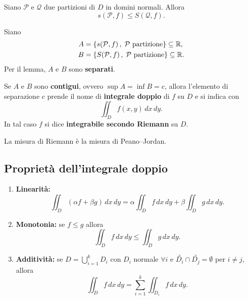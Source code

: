 \begin{lemma}
    Siano $\mathcal{P}$ e $\mathcal{Q}$ due partizioni di $D$ in domini normali. Allora
    \[
        s(\mathcal{P}, f) \le S(\mathcal{Q}, f).
    \]
\end{lemma}

Siano
\begin{align*}
    A &= \{ s(\mathcal{P}, f) \,,\; \mathcal{P} \text{ partizione} \} \subseteq \mathbb{R}, \\
    B &= \{ S(\mathcal{P}, f) \,,\; \mathcal{P} \text{ partizione} \} \subseteq \mathbb{R}.
\end{align*}
Per il lemma, $A$ e $B$ sono \textbf{separati}.

\begin{definition}
    Se $A$ e $B$ sono \textbf{contigui}, ovvero $\sup A = \inf B = c$, allora l'elemento di separazione $c$ prende il nome di
    \textbf{integrale doppio} di $f$ su $D$ e si indica con
    \[
        \iint_D f(x,y) \,dx\,dy .
    \]
    In tal caso $f$ si dice \textbf{integrabile secondo Riemann} su $D$.
\end{definition}

\begin{oss}
    La misura di Riemann è la misura di Peano--Jordan.

\end{oss}

\subsection{Proprietà dell'integrale doppio}

\begin{enumerate}[1)]
    \item \textbf{Linearità:}
          \[
              \iint_D (\alpha f + \beta g) \,dx\,dy = \alpha \iint_D f \,dx\,dy + \beta \iint_D g \,dx\,dy .
          \]
    \item \textbf{Monotonia:} se $f \le g$ allora
          \[
              \iint_D f \,dx\,dy \le \iint_D g \,dx\,dy .
          \]
    \item \textbf{Additività:} se $D = \displaystyle\bigcup_{i=1}^{k} D_i$ con $D_i$ normale $\forall i$ e $\overset{\circ}{D_i} \cap \overset{\circ}{D_j} = \emptyset$ per $i \neq j$, allora
          \[
              \iint_D f \,dx\,dy = \sum_{i=1}^{k} \iint_{D_i} f \,dx\,dy .
          \]
\end{enumerate}

